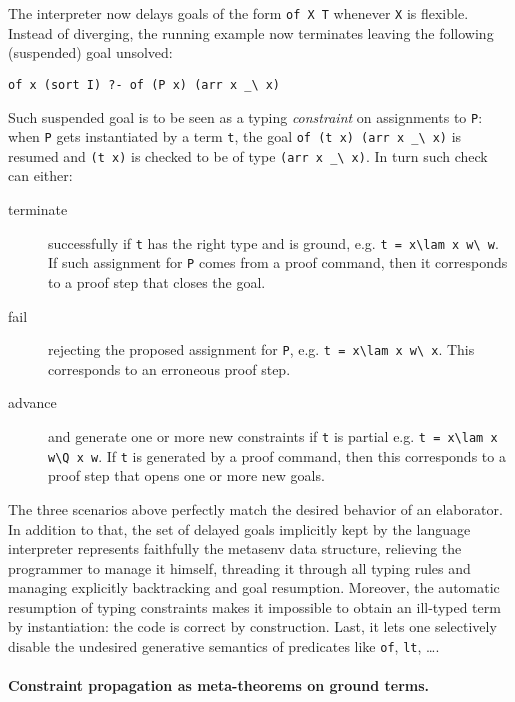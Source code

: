 \documentclass{easychair}
\begin{document}
The interpreter now delays goals of the form \verb+of X T+ whenever \verb+X+
is flexible. Instead of diverging, the running example now
terminates leaving the following (suspended) goal unsolved:

\begin{Verbatim}
of x (sort I) ?- of (P x) (arr x _\ x)
\end{Verbatim}

Such suspended goal is to be seen as a typing \emph{constraint} on
assignments to \verb+P+: when \verb+P+ gets instantiated by a
term \verb+t+, the goal \verb+of (t x) (arr x _\ x)+ is resumed
and \verb+(t x)+ is checked to be of type \verb+(arr x _\ x)+.
In turn such check can either:
\begin{description}
\item[terminate] successfully if \verb+t+ has the right type and is ground,
	e.g. \verb+t = x\lam x w\ w+.  If such assignment for \verb+P+
	comes from a proof command, then it corresponds to a proof
	step that closes the goal.
\item[fail] rejecting the proposed assignment for \verb+P+, e.g. 
	\verb+t = x\lam x w\ x+.  This corresponds to an erroneous proof
	step.
\item[advance] and generate one or more new constraints if \verb+t+ is partial
	e.g. \verb+t = x\lam x w\Q x w+.  If \verb+t+ is generated by
	a proof command, then this corresponds to a proof step that
	opens one or more new goals.
\end{description}
The three scenarios above perfectly match the desired behavior of an
elaborator.  In addition to that, the set of delayed goals implicitly kept
by the language interpreter
represents faithfully the metasenv data structure, relieving the
programmer to manage it himself, threading it through all typing rules and
managing explicitly backtracking and goal resumption.  Moreover, the automatic resumption of typing
constraints makes it impossible to obtain an ill-typed term by
instantiation: the code is correct by construction.  Last, it lets one selectively disable the undesired generative semantics of predicates like \verb+of+, \verb+lt+, \ldots.

\paragraph{Constraint propagation as meta-theorems on ground terms.} %
\end{document}

